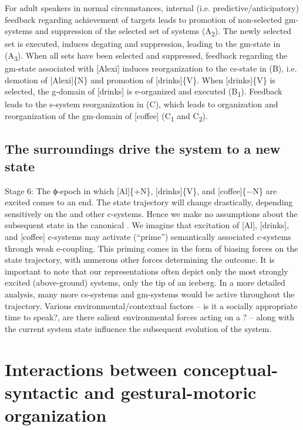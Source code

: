 For adult speakers in normal circumstances, internal (i.e. predictive/anticipatory) feedback regarding achievement of  targets leads to promotion of non-selected gm-systems and suppression of the selected set of systems (A\textsubscript{2}). The newly selected set is executed,  induces degating and suppression, leading to the gm-state in (A\textsubscript{3}). When all sets have been selected and suppressed, feedback regarding the gm-state associated with [Alexi] induces reorganization to the cs-state in (B), i.e. demotion of [Alexi]\{N\} and promotion of [drinks]\{V\}. When [drinks]\{V\} is selected, the g-domain of [drinks] is e-organized and executed (B\textsubscript{1}). Feedback leads to the s-system reorganization in (C), which leads to organization and reorganization of the gm-domain of [coffee] (C\textsubscript{1} and C\textsubscript{2}).

\subsection{The surroundings drive the system to a new state}

Stage 6: The ϕ-epoch in which [Al]\{+N\}, [drinks]\{V\}, and [coffee]\{−N\} are excited comes to an end. The state trajectory will change drastically, depending sensitively on the  and other c-systems. Hence we make no assumptions about the subsequent state in the canonical . We imagine that excitation of [Al], [drinks], and [coffee] c-systems may activate (“prime”) semantically associated c-systems through weak e-coupling. This priming comes in the form of biasing forces on the state trajectory, with numerous other  forces determining the outcome. It is important to note that our representations often depict only the most strongly excited (above-ground) systems, only the tip of an iceberg. In a more detailed analysis, many more cs-systems and gm-systems would be active throughout the trajectory. Various environmental/contextual factors -- is it a socially appropriate time to speak?, are there salient environmental forces acting on a ? -- along with the current system state influence the subsequent evolution of the system. 

\section{Interactions between conceptual-syntactic and gestural-motoric organization}

